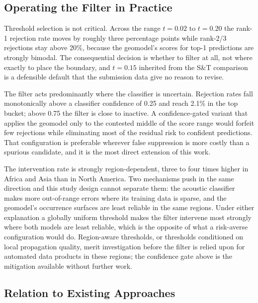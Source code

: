 \subsection{Operating the Filter in Practice}
\label{sec:disc-practice}

Threshold selection is not critical. Across the range $t = 0.02$ to $t = 0.20$ the rank-1 rejection rate moves by roughly three percentage points while rank-2/3 rejections stay above 20\%, because the geomodel's scores for top-1 predictions are strongly bimodal. The consequential decision is whether to filter at all, not where exactly to place the boundary, and $t = 0.15$ inherited from the S\&T comparison is a defensible default that the submission data give no reason to revise.

The filter acts predominantly where the classifier is uncertain. Rejection rates fall monotonically above a classifier confidence of 0.25 and reach 2.1\% in the top bucket; above 0.75 the filter is close to inactive. A confidence-gated variant that applies the geomodel only to the contested middle of the score range would forfeit few rejections while eliminating most of the residual risk to confident predictions. That configuration is preferable wherever false suppression is more costly than a spurious candidate, and it is the most direct extension of this work.

The intervention rate is strongly region-dependent, three to four times higher in Africa and Asia than in North America. Two mechanisms push in the same direction and this study design cannot separate them: the acoustic classifier makes more out-of-range errors where its training data is sparse, and the geomodel's occurrence surfaces are least reliable in the same regions. Under either explanation a globally uniform threshold makes the filter intervene most strongly where both models are least reliable, which is the opposite of what a risk-averse configuration would do. Region-aware thresholds, or thresholds conditioned on local propagation quality, merit investigation before the filter is relied upon for automated data products in these regions; the confidence gate above is the mitigation available without further work.

\subsection{Relation to Existing Approaches}
\label{sec:disc-related}

